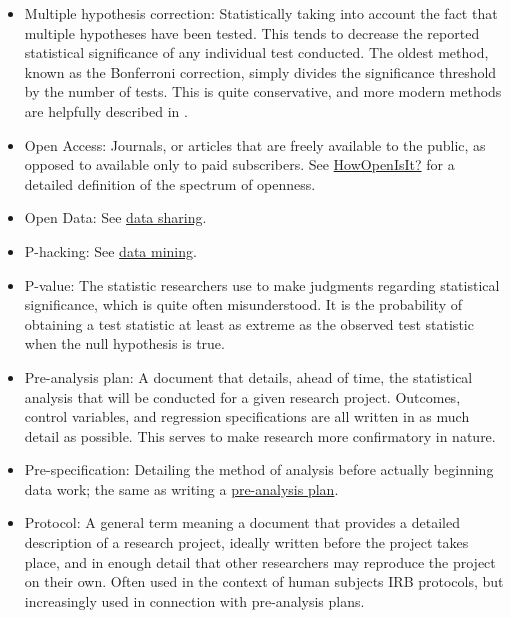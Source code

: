 \documentclass[12pt] {article}
\begin{document}
\begin{itemize}
\item
Multiple hypothesis correction: Statistically taking into account the fact that multiple hypotheses have been tested. This tends to decrease the reported statistical significance of any individual test conducted. The oldest method, known as the Bonferroni correction, simply divides the significance threshold by the number of tests. This is quite conservative, and more modern methods are helpfully described in \cite{anderson_fwer}.

\item
Open Access: Journals, or articles that are freely available to the public, as opposed to available only to paid subscribers. See \href{https://www.plos.org/open-access/howopenisit/}{HowOpenIsIt?} for a detailed definition of the spectrum of openness. 

\item
Open Data: See \hyperref[def-datasharing]{data sharing}.

\item
P-hacking: See \hyperref[def-mining]{data mining}.

\item \label{def-pvalue}
P-value: The statistic researchers use to make judgments regarding statistical significance, which is quite often misunderstood. It is the probability of obtaining a test statistic at least as extreme as the observed test statistic when the null hypothesis is true. 

\item\label{def-pap}
Pre-analysis plan: A document that details, ahead of time, the statistical analysis that will be conducted for a given research project. Outcomes, control variables, and regression specifications are all written in as much detail as possible. This serves to make research more confirmatory in nature. 

\item
Pre-specification: Detailing the method of analysis before actually beginning data work; the same as writing a \hyperref[def-pap]{pre-analysis plan}.

\item
Protocol: A general term meaning a document that provides a detailed description of a research project, ideally written before the project takes place, and in enough detail that other researchers may reproduce the project on their own. Often used in the context of human subjects IRB protocols, but increasingly used in connection with pre-analysis plans. 


\end{itemize}
\end{document}
